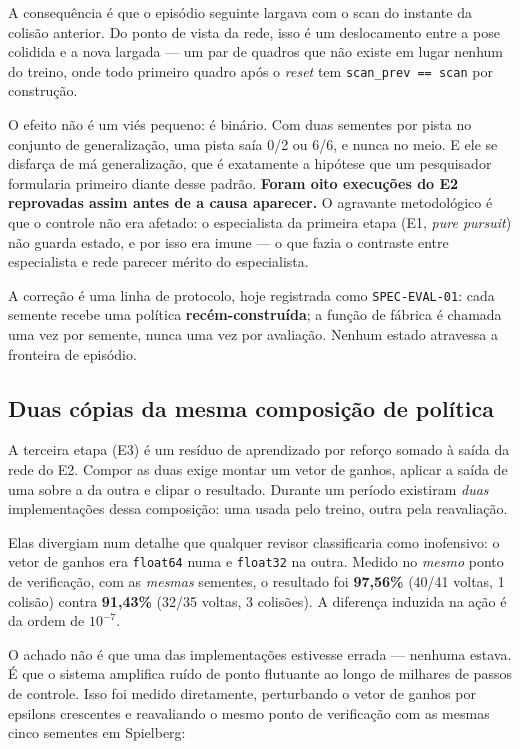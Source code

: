A consequência é que o episódio seguinte largava com o scan do instante da
colisão anterior. Do ponto de vista da rede, isso é um deslocamento entre a pose
colidida e a nova largada --- um par de quadros que não existe em lugar nenhum do
treino, onde todo primeiro quadro após o \textit{reset} tem
\texttt{scan\_prev == scan} por construção.

O efeito não é um viés pequeno: é binário. Com duas sementes por pista no
conjunto de generalização, uma pista saía 0/2 ou 6/6, e nunca no meio. E ele se
disfarça de má generalização, que é exatamente a hipótese que um pesquisador
formularia primeiro diante desse padrão. \textbf{Foram oito execuções do E2
reprovadas assim antes de a causa aparecer.} O agravante metodológico é que o
controle não era afetado: o especialista da primeira etapa (E1, \textit{pure
pursuit}) não guarda estado, e por isso era imune --- o que fazia o contraste
entre especialista e rede parecer mérito do especialista.

A correção é uma linha de protocolo, hoje registrada como
\texttt{SPEC-EVAL-01}: cada semente recebe uma política \textbf{recém-construída};
a função de fábrica é chamada uma vez por semente, nunca uma vez por avaliação.
Nenhum estado atravessa a fronteira de episódio.

\subsection{Duas cópias da mesma composição de política}\label{sec:val-duascopias}

A terceira etapa (E3) é um resíduo de aprendizado por reforço somado à saída da
rede do E2. Compor as duas exige montar um vetor de ganhos, aplicar a saída de
uma sobre a da outra e clipar o resultado. Durante um período existiram
\textit{duas} implementações dessa composição: uma usada pelo treino, outra pela
reavaliação.

Elas divergiam num detalhe que qualquer revisor classificaria como inofensivo: o
vetor de ganhos era \texttt{float64} numa e \texttt{float32} na outra. Medido no
\textit{mesmo} ponto de verificação, com as \textit{mesmas} sementes, o resultado
foi \textbf{97,56\%} (40/41 voltas, 1 colisão) contra \textbf{91,43\%} (32/35
voltas, 3 colisões). A diferença induzida na ação é da ordem de $10^{-7}$.

O achado não é que uma das implementações estivesse errada --- nenhuma estava. É
que o sistema amplifica ruído de ponto flutuante ao longo de milhares de passos
de controle. Isso foi medido diretamente, perturbando o vetor de ganhos por
epsilons crescentes e reavaliando o mesmo ponto de verificação com as mesmas
cinco sementes em Spielberg:

